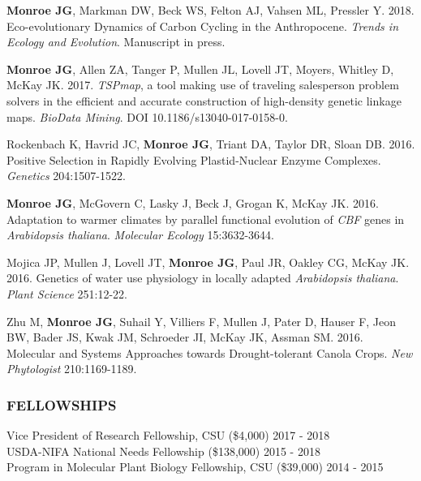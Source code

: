 \documentclass[12pt,english]{article}
\begin{document}
\begin{hangparas}{.5in}{1}
\hspace{1em}  \textbf{Monroe JG}, Markman DW, Beck WS, Felton AJ, Vahsen ML, Pressler Y. 2018. Eco-evolutionary Dynamics of Carbon Cycling in the Anthropocene. \textit{Trends in Ecology and Evolution}. Manuscript in press.
\vspace{1ex}\par
\hspace{1em}  \textbf{Monroe JG}, Allen ZA, Tanger P, Mullen JL, Lovell JT, Moyers, Whitley D, McKay JK. 2017. \textit{TSPmap}, a tool making use of traveling salesperson problem solvers in the efficient and accurate construction of high-density genetic linkage maps. \textit{BioData Mining}. DOI 10.1186/s13040-017-0158-0.
\vspace{1ex}\par
\hspace{1em} Rockenbach K, Havrid JC, \textbf{Monroe JG}, Triant DA, Taylor DR, Sloan DB. 2016. Positive Selection in Rapidly Evolving Plastid-Nuclear Enzyme Complexes. \textit{Genetics} 204:1507-1522.
\vspace{1ex}\par
\hspace{1em} \textbf{Monroe JG}, McGovern C, Lasky J, Beck J, Grogan K, McKay JK. 2016. Adaptation to warmer climates by parallel functional evolution of \textit{CBF} genes in \textit{Arabidopsis thaliana}. \textit{Molecular Ecology} 15:3632-3644.
\vspace{1ex}\par
\hspace{1em} Mojica JP, Mullen J, Lovell JT, \textbf{Monroe JG}, Paul JR, Oakley CG, McKay JK. 2016. Genetics of water use physiology in locally adapted \textit{Arabidopsis thaliana}. \textit{Plant Science}  251:12-22.
\vspace{1ex}\par
\hspace{1em} Zhu M, \textbf{Monroe JG}, Suhail Y, Villiers F, Mullen J, Pater D, Hauser F, Jeon BW, Bader JS, Kwak JM, Schroeder JI, McKay JK, Assman SM. 2016. Molecular and Systems Approaches towards Drought-tolerant Canola Crops. \textit{New Phytologist} 210:1169-1189.
\end{hangparas}
\vspace{1ex}


\subsubsection*{FELLOWSHIPS}
\vspace{-0.5ex}
\hspace*{1.0em} Vice President of Research Fellowship, CSU (\$4,000)
\hfill 
2017 - 2018
\vspace{1ex}\\
\hspace*{1.0em} USDA-NIFA National Needs Fellowship (\$138,000)
\hfill 
2015 - 2018
\vspace{1ex}\\
\hspace*{1.0em} Program in Molecular Plant Biology Fellowship, CSU (\$39,000)
\hfill 
2014 - 2015
\vspace{1ex}
\end{document}
